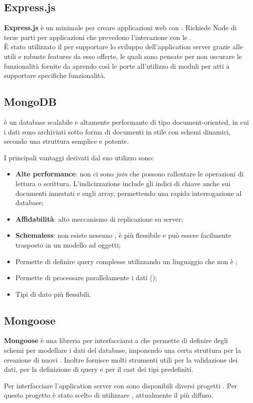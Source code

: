 \subsection{Express.js}
\textbf{Express.js} è un  minimale per creare applicazioni web con . Richiede  Node di terze parti per applicazioni che prevedono l'interazione con le . \\
È stato utilizzato il   per supportare lo sviluppo dell'application server grazie alle utili e robuste features da esso offerte, le quali sono pensate per non oscurare le funzionalità fornite da  aprendo così le porte all'utilizzo di moduli per  atti a supportare specifiche funzionalità.

\subsection{MongoDB}
 è un database   scalabile e altamente performante di tipo document-oriented, in cui i dati sono archiviati sotto forma di documenti in stile  con schemi dinamici, secondo una struttura semplice e potente.

I principali vantaggi derivati dal suo utilizzo sono:
\begin{itemize}
	\item \textbf{Alte performance}: non ci sono \emph{join} che possono rallentare le operazioni di lettura o scrittura. L'indicizzazione include gli indici di chiave anche sui documenti innestati e sugli array, permettendo una rapida interrogazione al database;
	\item \textbf{Affidabilità}: alto meccanismo di replicazione su server;
	\item \textbf{Schemaless}: non esiste nessuno , è più flessibile e può essere facilmente trasposto in un modello ad oggetti;
	\item Permette di definire query complesse utilizzando un linguaggio che non è ;
	\item Permette di processare parallelamente i dati ();
	\item Tipi di dato più flessibili.
\end{itemize}

\subsection{Mongoose}
\textbf{Mongoose} è una libreria per interfacciarsi a  che permette di definire degli schemi per modellare i dati del database, imponendo una certa struttura per la creazione di nuovi . Inoltre fornisce molti strumenti utili per la validazione dei dati, per la definizione di query e per il cast dei tipi predefiniti.

Per interfacciare l'application server con  sono disponibili diversi progetti . Per questo progetto è stato scelto di utilizzare , attualmente il più diffuso.